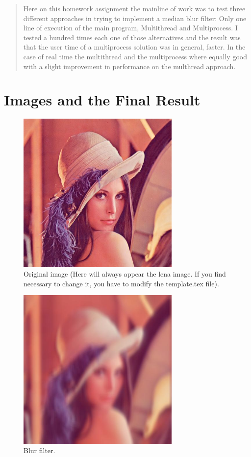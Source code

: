 \documentclass[12pt]{article}
\begin{document}
\maketitle

\begin{abstract}
    Here on this homework assignment the mainline of work was to test three different approaches in trying to implement a median
    blur filter: Only one line of execution of the main program, Multithread and Multiprocess. I tested a hundred times each one of those
    alternatives and the result was that the user time of a multiprocess solution was in general, faster. In the case of real time the multithread and
    the multiprocess where equally good with a slight improvement in performance on the multhread approach.
\end{abstract}

\section{Images and the Final Result}
     \begin{figure}[H]
         \caption{Original image (Here will always appear the lena image. If you find necessary to change it, you have to modify the template.tex file).}
        \centering
        \includegraphics[width=8cm]{data/lena.jpg}
    \end{figure}
    \begin{figure}[H]
        \caption{Blur filter.}
        \centering
        \includegraphics[width=8cm]{data/out.jpg}
    \end{figure}
\end{document}
